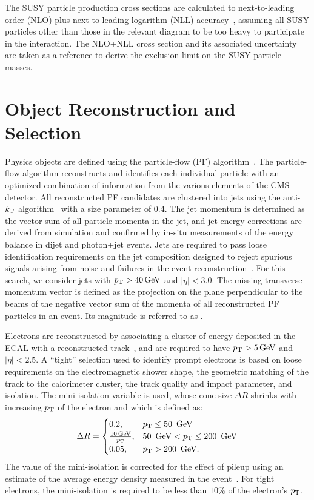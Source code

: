 The SUSY particle production cross sections are calculated to next-to-leading
order (NLO) plus next-to-leading-logarithm (NLL)
accuracy~\cite{NLONLL1,NLONLL2,NLONLL3,NLONLL4,NLONLL5,Borschensky:2014cia}, assuming all
SUSY particles other than those in the relevant diagram to be too
heavy to participate in the interaction. The NLO+NLL cross section and
its associated uncertainty~\cite{Kramer:2012bx} are taken as a
reference to derive the exclusion limit on the SUSY particle masses.


\section{Object Reconstruction and Selection}
\label{sec:Objects}

Physics objects are defined using the particle-flow (PF)
algorithm~\cite{PF1, PF2}. The particle-flow 
algorithm reconstructs and identifies each individual particle with an optimized
combination of information from the various elements of the CMS
detector. All reconstructed PF candidates are clustered into jets using the 
anti-$k_{\mathrm{T}}$ algorithm~\cite{antikt, fastjet} with a size parameter
of 0.4. The jet momentum is determined as the vector sum of all particle momenta
in the jet, and jet energy corrections are derived from simulation and
confirmed by in-situ measurements of the energy balance in dijet
and photon+jet events. Jets are required to pass loose identification requirements 
on the jet composition designed to reject spurious signals arising from noise and 
failures in the event reconstruction~\cite{CMS-PAS-JME-10-003}.
For this search, we consider jets with $p_{\mathrm{T}}>40\,\text{Ge\hspace{-.08em}V}$ and
$|\eta|<3.0$. The missing transverse momentum vector \ptvecmiss
is defined as the projection on the plane perpendicular to the beams of
the negative vector sum of the momenta of all reconstructed PF particles in
an event. Its magnitude is referred to as \ETmiss.

Electrons are reconstructed by associating a cluster of
energy deposited in the ECAL with a reconstructed track~\cite{Khachatryan:2015hwa}, 
and are required to have $p_{\mathrm{T}} > 5 \,\text{Ge\hspace{-.08em}V}$ and $|\eta|<2.5$. A ``tight'' selection
used to identify prompt electrons is based on loose requirements
on the electromagnetic shower shape, the geometric matching of
the track to the calorimeter cluster, the track quality and impact
parameter, and isolation. The mini-isolation variable is used,
whose cone size $\Delta R$ shrinks with increasing $p_{\mathrm{T}}$ of the 
electron and which is defined as:
\begin{eqnarray}
 \label{eq:miniIsolation}
 \Delta R= 
 \begin{cases}
 0.2, & p_{\mathrm{T}} \le 50\ \,\text{Ge\hspace{-.08em}V}\\
 \frac{10 \,\text{Ge\hspace{-.08em}V}}{p_{\mathrm{T}}}, & 50\ \,\text{Ge\hspace{-.08em}V} < p_{\mathrm{T}} \le 200\ \,\text{Ge\hspace{-.08em}V} \\
 0.05, & p_{\mathrm{T}} > 200\ \,\text{Ge\hspace{-.08em}V}. \\
\end{cases}
 \end{eqnarray}
The value of the mini-isolation is corrected for the effect of pileup using an estimate of 
the average energy density measured in the event~\cite{CMS-PAS-JME-14-001}. 
For tight electrons, the mini-isolation is required to be less than $10\%$ of 
the electron's $p_{\mathrm{T}}$.

